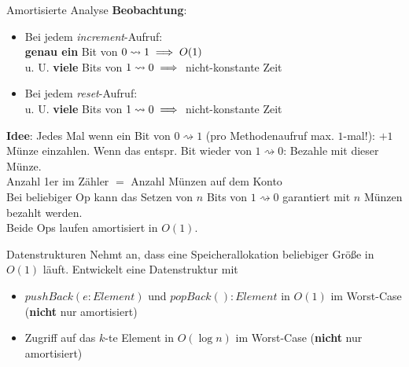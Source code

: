 \begin{frame}{Amortisierte Analyse}
	\solutionheading \smallskip
	\textbf{Beobachtung}: 
	\begin{itemize}
		\item Bei jedem \emph{increment}-Aufruf: \\
			  \textbf{genau ein} Bit von $0 \rightsquigarrow 1 \Impl O(1)$ \\
			  u. U. \textbf{viele} Bits von $1 \rightsquigarrow 0 \Impl$ nicht-konstante Zeit
		\pause
		\item Bei jedem \emph{reset}-Aufruf: \\
			  u. U. \textbf{viele} Bits von $1 \rightsquigarrow 0 \Impl$ nicht-konstante Zeit
	\end{itemize}
	\pause
	\textbf{Idee}: Jedes Mal wenn ein Bit von $0 \rightsquigarrow 1$ (pro Methodenaufruf max. $1$-mal!): $+1$ Münze einzahlen. Wenn das entspr. Bit wieder von $1 \rightsquigarrow 0$: Bezahle mit dieser Münze. \\
	\pause
	\impl Anzahl 1er im Zähler $=$ Anzahl Münzen auf dem Konto \\
	\pause
	\impl Bei beliebiger Op kann das Setzen von $n$ Bits von $1 \rightsquigarrow 0$ garantiert mit $n$ Münzen bezahlt werden. \\
	\pause
	\impl Beide Ops laufen amortisiert in $O(1)$.
\end{frame}



\begin{frame}{Datenstrukturen}
	Nehmt an, dass eine Speicherallokation beliebiger Größe in $O(1)$ läuft. Entwickelt eine Datenstruktur mit
	\begin{itemize}
		\item $pushBack(e : Element)$ und $popBack() : Element$ in $O(1)$ im Worst-Case (\textbf{nicht} nur amortisiert)
		\item Zugriff auf das $k$-te Element in $O(\log n)$ im Worst-Case (\textbf{nicht} nur amortisiert)
	\end{itemize}
\end{frame}

